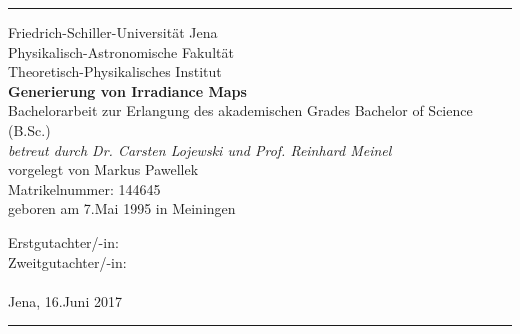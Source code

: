 \newcommand{\vrulefill}{\par\leaders\hbox{$\cdot$}\vfill}

\begin{titlepage}
	\thispagestyle{empty}
	\noindent

	\begin{minipage}{\textwidth}
		\rule{1.5pt}{0.3\textheight}%

		\vspace{5mm}
		\noindent
		{\Large Friedrich-Schiller-Universität Jena \\ Physikalisch-Astronomische Fakultät \\ Theoretisch-Physikalisches Institut \\[2\baselineskip]}
		{\Huge\bfseries Generierung von Irradiance Maps}\\[2\baselineskip]
		{\large Bachelorarbeit zur Erlangung des akademischen Grades Bachelor of Science (B.Sc.)\\}
		{\large \textit{betreut durch Dr. Carsten Lojewski und Prof. Reinhard Meinel}}\\[4\baselineskip]
		{\Large vorgelegt von Markus Pawellek} \\
		{\Large Matrikelnummer: 144645}\\
		{\large geboren am 7.Mai 1995 in Meiningen}

		\vspace{0.1\textheight} %
		\noindent
		{\Large Erstgutachter/-in:} \\
		{\Large Zweitgutachter/-in:} \\
		\\[\baselineskip] %
		Jena, 16.Juni 2017
		\vspace{5mm} \\
		\rule{1.5pt}{0.2\textheight}
	\end{minipage}

	\setcounter{page}{0}
\end{titlepage}
